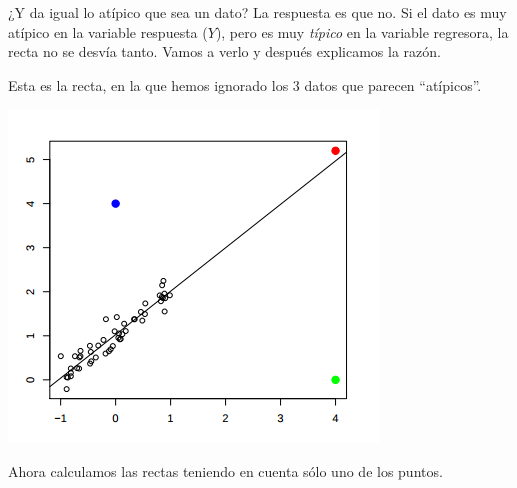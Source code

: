 \begin{example}
\label{ej:reg_simple}
¿Y da igual lo atípico que sea un dato? La respuesta es que no. Si el dato es muy atípico en la variable respuesta ($Y$), pero es muy \textit{típico} en la variable regresora, la recta no se desvía tanto. Vamos a verlo y después explicamos la razón.

Esta es la recta, en la que hemos ignorado los 3 datos que parecen ``atípicos''.
\begin{center}
\includegraphics[scale=0.9]{img/sobredistanciahorizontal.png}
\end{center}

Ahora calculamos las rectas teniendo en cuenta sólo uno de los puntos.


\end{example}
